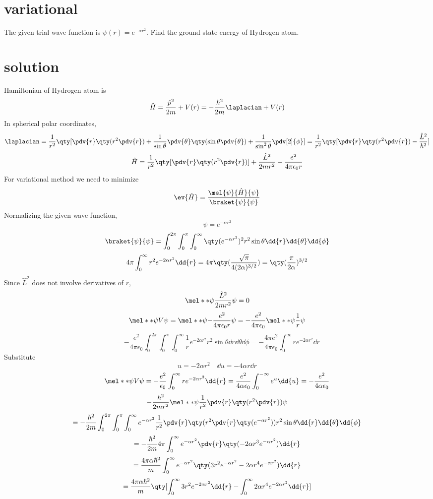 \section*{variational}
The given trial wave function is $\psi(r)=e^{-\alpha r^2}$. Find the ground state energy of Hydrogen atom.
\section*{solution}
Hamiltonian of Hydrogen atom is \[\hat{H}=\frac{\hat{p}^2}{2m}+V(r)=-\frac{\hbar^2}{2m}\laplacian+V(r)\]
In spherical polar coordinates, 
\[\laplacian=\frac{1}{r^2}\qty[\pdv{r}\qty(r^2\pdv{r})+\frac{1}{\sin\theta}\pdv{\theta}\qty(\sin\theta\pdv{\theta})+\frac{1}{\sin^2\theta}\pdv[2]{\phi}]=\frac{1}{r^2}\qty[\pdv{r}\qty(r^2\pdv{r})-\frac{\hat{L}^2}{\hbar^2}]\]
\[\hat{H}=\frac{1}{r^2}\qty[\pdv{r}\qty(r^2\pdv{r})]+\frac{\hat{L}^2}{2mr^2}-\frac{e^2}{4\pi\epsilon_0 r}\]
For variational method we need to minimize \[\ev{\hat{H}}=\frac{\mel{\psi}{\hat{H}}{\psi}}{\braket{\psi}{\psi}}\]
Normalizing the given wave function,
\[\psi=e^{-\alpha r^2}\]
\[\braket{\psi}{\psi}=\int_0^{2\pi}\int_0^{\pi}\int_0^{\infty}\qty(e^{-\alpha r^2})^2r^2\sin\theta\dd{r}\dd{\theta}\dd{\phi}\]
\[4\pi \int_0^{\infty}r^2e^{-2\alpha r^2}\dd{r}=4\pi \qty(\frac{\sqrt{\pi}}{4(2\alpha)^{3/2}})=\qty(\frac{\pi}{2\alpha})^{3/2}\]
Since $\hat{L}^2$ does not involve derivatives of $r$,
\[\mel**{\psi}{\frac{\hat{L}^2}{2mr^2}}{\psi}=0\]
\[\mel**{\psi}{V}{\psi}=\mel**{\psi}{-\frac{e^2}{4\pi\epsilon_0 r}}{\psi}=-\frac{e^2}{4\pi\epsilon_0 }\mel**{\psi}{\frac{1}{ r}}{\psi}\]
\[=-\frac{e^2}{4\pi\epsilon_0 }\int_0^{2\pi}\int_0^{\pi}\int_0^{\infty}\frac{1}{r}e^{-2\alpha r^2}r^2\sin\theta\dd{r}\dd{\theta}\dd{\phi}=-\frac{4\pi e^2}{4\pi\epsilon_0 }\int_0^{\infty}re^{-2\alpha r^2}\dd{r}\]
Substitute \[u=-2\alpha r^2\quad \dd{u}=-4\alpha r \dd{r}\]
\[\mel**{\psi}{V}{\psi}=-\frac{e^2}{\epsilon_0 }\int_0^{\infty}re^{-2\alpha r^2}\dd{r}=\frac{e^2}{4\alpha\epsilon_0 }\int_0^{-\infty}e^{u}\dd{u}=-\frac{e^2}{4\alpha\epsilon_0}\]
\newpage
\[-\frac{\hbar^2}{2mr^2}\mel**{\psi}{\frac{1}{r^2}\pdv{r}\qty(r^2\pdv{r})}{\psi}\]
\[=-\frac{\hbar^2}{2m}\int_0^{2\pi}\int_0^{\pi}\int_0^{\infty}e^{-\alpha r^2}\frac{1}{r^2}\pdv{r}\qty(r^2\pdv{r}\qty(e^{-\alpha r^2}))r^2\sin\theta\dd{r}\dd{\theta}\dd{\phi}\]
\[=-\frac{\hbar^2}{2m}4\pi\int_0^{\infty}e^{-\alpha r^2}\pdv{r}\qty(-2\alpha r^3e^{-\alpha r^2})\dd{r}\]
\[=\frac{4\pi\alpha\hbar^2}{m}\int_0^{\infty}e^{-\alpha r^2}\qty(3r^2e^{-\alpha r^2} -2\alpha r^4e^{-\alpha r^2})\dd{r}\]
\[=\frac{4\pi\alpha\hbar^2}{m}\qty[\int_0^{\infty}3r^2e^{-2\alpha r^2}\dd{r}-\int_0^{\infty}2\alpha r^4e^{-2\alpha r^2}\dd{r}]\]

